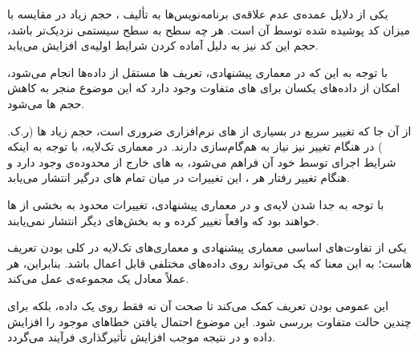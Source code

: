 
یکی از دلایل عمده‌ی عدم علاقه‌ی برنامه‌نویس‌ها به تألیف ، حجم زیاد  در مقایسه با میزان کد پوشیده شده توسط آن است. هر چه سطح  به سطح سیستمی نزدیک‌تر باشد، حجم این کد نیز به دلیل آماده کردن شرایط اولیه‌ی  افزایش می‌یابد.

با توجه به این که در معماری پیشنهادی، تعریف ‌ها مستقل از داده‌ها انجام می‌شود، امکان  از داده‌های یکسان برای ‌های متفاوت وجود دارد که این موضوع منجر به کاهش حجم ‌ها می‌شود.

از آن جا که تغییر سریع در بسیاری از ‌های نرم‌افزاری ضروری است، حجم زیاد ‌ها (ر.ک. ) در هنگام تغییر نیز نیاز به هم‌گام‌سازی دارند. در معماری تک‌لایه، با توجه به اینکه شرایط اجرای  توسط خود آن فراهم می‌شود،  به ‌های خارج از محدوده‌ی  وجود دارد و هنگام تغییر رفتار هر ، این تغییرات در میان تمام ‌های درگیر انتشار می‌یابد.

با توجه به جدا شدن لایه‌ی  و  در معماری پیشنهادی، تغییرات محدود به بخشی از ‌ها خواهند بود که واقعاً تغییر کرده و به بخش‌های دیگر انتشار نمی‌یابند.


یکی از تفاوت‌های اساسی معماری پیشنهادی و معماری‌های تک‌لایه در کلی بودن تعریف ‌هاست؛ به این معنا که یک  می‌تواند روی داده‌های مختلفی قابل اعمال باشد. بنابراین، هر  عملاً معادل یک مجموعه‌ی  عمل می‌کند.

این عمومی بودن تعریف  کمک می‌کند تا صحت آن نه فقط روی یک داده، بلکه برای چندین حالت متفاوت بررسی شود. این موضوع احتمال یافتن خطاهای موجود را افزایش داده و در نتیجه موجب افزایش تأثیرگذاری فرآیند  می‌گردد.
